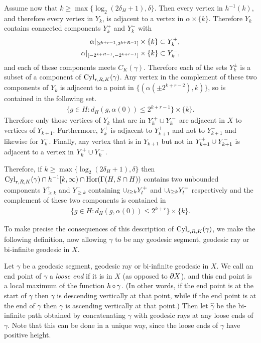 Assume now that $k \geq \max\{\log_2(2\delta_H + 1),\delta\}$. Then every vertex in $h^{-1}(k)$, and therefore every vertex in $Y_k$, is adjacent to a vertex in $\alpha \times \{k\}$. 
Therefore $Y_k$ contains connected components $Y_k^+$ and $Y_k^-$ with
\begin{align}
  \alpha\vert_{[2^{k+r-1}, 2^{k+R-1}]} \times \{k\} & \subset Y_k^+,\\
  \alpha\vert_{[-2^{k+R-1}, -2^{k+r-1}]} \times \{k\} & \subset Y_k^-,\\
\end{align}
and each of these components meets $C_K(\gamma)$. 
Therefore each of the sets $Y_k^\pm$ is a subset of a component of $\operatorname{Cyl}_{r, R, K}(\gamma)$. 
Any vertex in the complement of these two components of $Y_k$ is adjacent to a point in $\{(\alpha(\pm 2^{k+r-2}), k)\}$, so is contained in the following set.
\begin{align}
  \{g \in H \colon d_H(g, \alpha(0)) \leq 2^{k + r - 1}\} \times \{k\}.
\end{align}
Therefore only those vertices of $Y_k$ that are in $Y_k^+ \cup Y_k^-$ are adjacent in $X$ to vertices of $Y_{k+1}$. 
Furthermore, $Y_k^+$ is adjacent to $Y_{k+1}^+$ and not to $Y_{k+1}^-$ and likewise for $Y_k^-$. 
Finally, any vertex that is in $Y_{k+1}$ but not in $Y_{k+1}^{+} \cup Y_{k+1}^{-}$ is adjacent to a vertex in $Y_{k}^{+} \cup Y_{k}^{-}$.

Therefore, if $k \geq \max\{\log_2(2\delta_H + 1),\delta\}$ then $\operatorname{Cyl}_{r, R, K}(\gamma) \cap h^{-1}[k, \infty) \cap \operatorname{Hor}(\operatorname{\Gamma}(H, S \cap H))$ contains two unbounded components $Y_{\geq k}^+$ and $Y_{\geq k}^-$ containing $\cup_{l \geq k} Y_l^+$ and $\cup_{l \geq k} Y_l^-$ respectively and the complement of these two components is contained in
\begin{align}
  \{g \in H \colon d_H(g, \alpha(0)) \leq 2^{k + r}\} \times \{k\}.
\end{align}

To make precise the consequences of this description of $\operatorname{Cyl}_{r, R, K}(\gamma)$,
we make the following definition, now allowing $\gamma$ to be any geodesic segment, geodesic ray or bi-infinite geodesic in $X$.

\begin{definition}\label{definition:loose_ends}
  Let $\gamma$ be a geodesic segment, geodesic ray or bi-infinite geodesic in $X$.
  We call an end point of $\gamma$ a \emph{loose end} if it is in $X$ (as opposed to $\partial X$), and this end point is a local maximum of the function $h \operatorname{\circ} \gamma$.
  (In other words, if the end point is at the start of $\gamma$ then $\gamma$ is descending vertically at that point, while if the end point is at the end of $\gamma$ then $\gamma$ is ascending vertically at that point.)
  Then let $\hat\gamma$ be the bi-infinite path obtained by concatenating $\gamma$ with geodesic rays at any loose ends of $\gamma$.
  Note that this can be done in a unique way, since the loose ends of $\gamma$ have positive height.
\end{definition}

